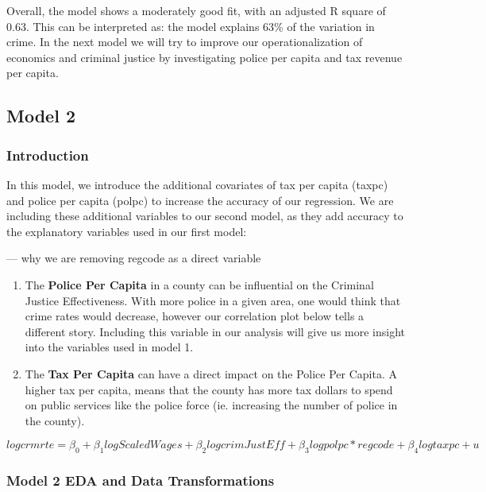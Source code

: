 \documentclass[]{article}
\begin{document}
Overall, the model shows a moderately good fit, with an adjusted R
square of 0.63. This can be interpreted as: the model explains 63\% of
the variation in crime. In the next model we will try to improve our
operationalization of economics and criminal justice by investigating
police per capita and tax revenue per capita.

\hypertarget{model-2}{%
\subsection{Model 2}\label{model-2}}

\hypertarget{introduction-2}{%
\subsubsection{Introduction}\label{introduction-2}}

In this model, we introduce the additional covariates of tax per capita
(taxpc) and police per capita (polpc) to increase the accuracy of our
regression. We are including these additional variables to our second
model, as they add accuracy to the explanatory variables used in our
first model:

--- why we are removing regcode as a direct variable

\begin{enumerate}
\def\labelenumi{\arabic{enumi}.}
\item
  The \textbf{Police Per Capita} in a county can be influential on the
  Criminal Justice Effectiveness. With more police in a given area, one
  would think that crime rates would decrease, however our correlation
  plot below tells a different story. Including this variable in our
  analysis will give us more insight into the variables used in model 1.
\item
  The \textbf{Tax Per Capita} can have a direct impact on the Police Per
  Capita. A higher tax per capita, means that the county has more tax
  dollars to spend on public services like the police force (ie.
  increasing the number of police in the county).
\end{enumerate}

\[logcrmrte = \beta_0 + \beta_1logScaledWages + \beta_2logcrimJustEff + \beta_3logpolpc * regcode + \beta_4logtaxpc + u\]

\hypertarget{model-2-eda-and-data-transformations}{%
\subsubsection{Model 2 EDA and Data
Transformations}\label{model-2-eda-and-data-transformations}}
\end{document}
